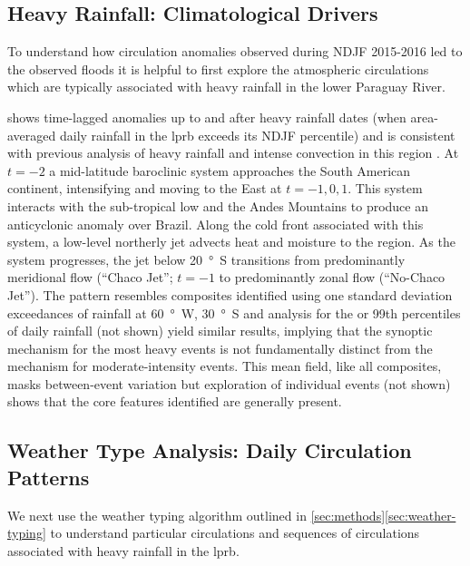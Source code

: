 \documentclass[twocol]{ametsoc}
\begin{document}
\subsection{Heavy Rainfall: Climatological Drivers} \label{sec:rainfall-circulation}

To understand how circulation anomalies observed during NDJF 2015-2016 led to the observed floods it is helpful to first explore the atmospheric circulations which are typically associated with heavy rainfall in the lower Paraguay River.

 shows time-lagged anomalies up to and after heavy rainfall dates (when area-averaged daily rainfall in the \gls{lprb} exceeds its NDJF  percentile) and is consistent with previous analysis of heavy rainfall and intense convection in this region \citep{Liebmann2004,Marengo2004,Salio2007,Marwan2015}.
At $t=-2$ a mid-latitude baroclinic system approaches the South American continent, intensifying and moving to the East at $t=-1,0,1$.
This system interacts with the sub-tropical low and the Andes Mountains to produce an anticyclonic anomaly over Brazil.
Along the cold front associated with this system, a low-level northerly jet advects  heat and moisture to the region.
As the system progresses, the jet below \SI{20}{\degree S} transitions from predominantly meridional flow (``Chaco Jet''; $t=-1$ to predominantly zonal flow (``No-Chaco Jet'').
The pattern resembles composites identified using one standard deviation exceedances of rainfall at \SI{60}{\degree W}, \SI{30}{\degree S} \citep{Liebmann2004} and analysis for the  or 99th percentiles of daily rainfall (not shown) yield similar results, implying that the synoptic mechanism for the most heavy events is not fundamentally distinct from the mechanism for moderate-intensity events.
This mean field, like all composites, masks between-event variation but exploration of individual events (not shown) shows that the core features identified are generally present.

\subsection{Weather Type Analysis: Daily Circulation Patterns} \label{sec:weather-types}

We next use the weather typing algorithm outlined in \cref{sec:methods}\ref{sec:weather-typing} to understand particular circulations and sequences of circulations associated with heavy rainfall in the \gls{lprb}.
\end{document}
